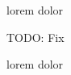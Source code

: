 

\clozesetoption[margin]{2cm}
\clozesetoption[thickness]{0.4pt}
lorem  dolor

TODO: Fix

\clozereset

lorem  dolor

\bye
